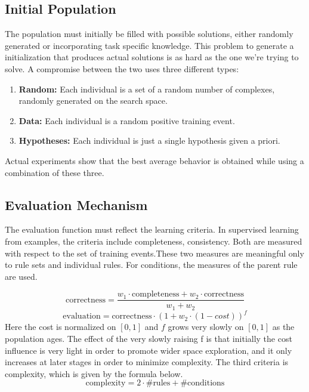 \documentclass[../main.tex]{subfiles}
\begin{document}
\subsection{Initial Population}
The population must initially be filled with possible solutions, either randomly generated or incorporating task
specific knowledge. This problem to generate a initialization that produces actual solutions is as hard as the one
we're trying to solve. A compromise between the two uses three different types:

\begin{enumerate}
	\item \textbf{Random:} Each individual is a set of a random number of complexes, randomly generated on the search
	space.
	\item \textbf{Data:} Each individual is a random positive training event.
	\item \textbf{Hypotheses:} Each individual is just a single hypothesis given a priori.
\end{enumerate}

Actual experiments show that the best average behavior is obtained while using a combination of these three.

\subsection{Evaluation Mechanism}
The evaluation function must reflect the learning criteria. In supervised learning from examples, the criteria include
completeness, consistency. Both are measured with respect to the set of training events.These two measures are
meaningful only to rule sets and individual rules. For conditions, the measures of the parent rule are used.

\begin{equation}
\text{correctness} = \frac{w_1 \cdot \text{completeness} + w_2 \cdot \text{correctness}}{w_1 + w_2}
\end{equation}
\begin{equation}
	\text{evaluation} = \text{correctness} \cdot (1 + w_2 \cdot (1-cost))^f
\end{equation}
Here the cost is normalized on $[0,1]$ and $f$ grows very slowly on $[0,1]$ as the population ages. The effect of the
very slowly raising f is that initially the cost influence is very light in order to promote wider space exploration,
and it only increases at later stages in order to minimize complexity. The third criteria is complexity, which is given
by the formula below.
\begin{equation}
	\text{complexity} = 2 \cdot \text{\#rules} + \text{\#conditions}
\end{equation}
\end{document}
